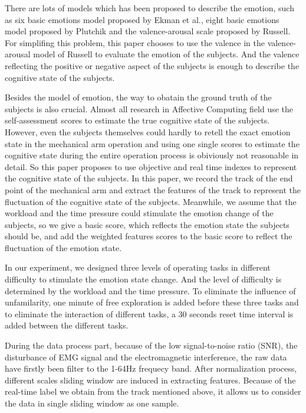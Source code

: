 \documentclass[runningheads,a4paper]{llncs}
\begin{document}
There are lots of models which has been proposed to describe the emotion, such as
six basic emotions model proposed by Ekman et al.\cite{Ekman}, eight basic emotions
model proposed by Plutchik\cite{Plutchik} and the valence-arousal scale proposed
by Russell\cite{Russell}. For simplifing this problem, this paper chooses to use the
valence in the valence-arousal model of Russell to evaluate the emotion of the subjects.
And the valence reflecting the positive or negative aspect of the subjects is enough
to describe the cognitive state of the subjects.


Besides the model of emotion, the way to obatain the ground truth of the subjects
is also crucial. Almost all research in Affective Computing field use the self-assessment
scores to estimate the true cognitive state of the subjects. However, even the subjects
themselves could hardly to retell the exact emotion state in the mechanical arm operation
and using one single scores to estimate the cognitive state during the entire operation process
 is obiviously not reasonable in detail. So this paper proposes to use objective and real time
 indexes to represent the cognitive state of the subjects. In this paper, we record the track
 of the end point of the mechanical arm and extract the features of the track to represent
 the fluctuation of the cognitive state of the subjects. Meanwhile, we assume that the workload
  and the time pressure could stimulate the emotion change of the subjects, so we give a
  basic score, which reflects the emotion state the subjects should be, and add the weighted
  features scores to the basic score to reflect the fluctuation of the emotion state.


In our experiment, we designed three levels of operating tasks in different difficulty to
  stimulate the emotion state change. And the level of difficulty is determined by the
  workload and the time pressure. To eliminate the influence of unfamilarity, one minute
  of free exploration is added before these three tasks and to eliminate the interaction
  of different tasks, a 30 seconds reset time interval is added between the different
  tasks.


During the data process part, because of the low signal-to-noise ratio (SNR),
the disturbance of EMG signal and the electromagnetic interference, the raw data
have firstly been filter to the 1-64Hz frequecy band\cite{Feature}. After normalization
process, different scales sliding window are induced in extracting features. Because of
the real-time label we obtain from the track mentioned above, it allows us to consider the
data in single sliding window as one sample.
\end{document}

